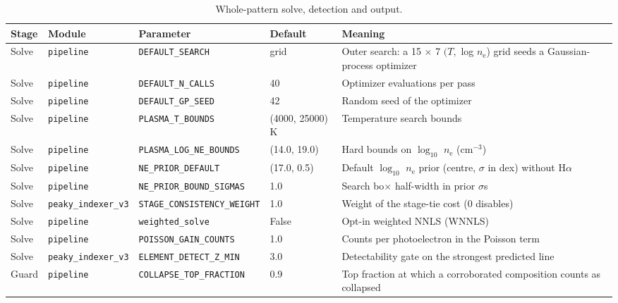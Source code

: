 \begin{table}[!htbp]
\centering
\caption{Whole-pattern solve, detection and output.}
\label{tab:params-solve}
\scriptsize
\setlength{\tabcolsep}{4pt}
\begin{tabular}{@{}p{}p{}p{}p{}p{}@{}}
\toprule
Stage & Module & Parameter & Default & Meaning \\
\midrule
Solve & \texttt{pipeline} & \texttt{DEFAULT\_\allowbreak{}SEARCH} & grid & Outer search: a 15 $\times$ 7 $(T,$ log $n_\mathrm{e}$) grid seeds a Gaussian-process optimizer \\
Solve & \texttt{pipeline} & \texttt{DEFAULT\_\allowbreak{}N\_\allowbreak{}CALLS} & 40 & Optimizer evaluations per pass \\
Solve & \texttt{pipeline} & \texttt{DEFAULT\_\allowbreak{}GP\_\allowbreak{}SEED} & 42 & Random seed of the optimizer \\
Solve & \texttt{pipeline} & \texttt{PLASMA\_\allowbreak{}T\_\allowbreak{}BOUNDS} & (4000, 25000) K & Temperature search bounds \\
Solve & \texttt{pipeline} & \texttt{PLASMA\_\allowbreak{}LOG\_\allowbreak{}NE\_\allowbreak{}BOUNDS} & (14.0, 19.0) & Hard bounds on $\log_{10}$ $n_\mathrm{e}$ (cm$^{-3}$) \\
Solve & \texttt{pipeline} & \texttt{NE\_\allowbreak{}PRIOR\_\allowbreak{}DEFAULT} & (17.0, 0.5) & Default $\log_{10}$ $n_\mathrm{e}$ prior (centre, $\sigma$ in dex) without H$\alpha$ \\
Solve & \texttt{pipeline} & \texttt{NE\_\allowbreak{}PRIOR\_\allowbreak{}BOUND\_\allowbreak{}SIGMAS} & 1.0 & Search bo$\times$ half-width in prior $\sigma$s \\
Solve & \texttt{peaky\_\allowbreak{}indexer\_\allowbreak{}v3} & \texttt{STAGE\_\allowbreak{}CONSISTENCY\_\allowbreak{}WEIGHT} & 1.0 & Weight of the stage-tie cost (0 disables) \\
Solve & \texttt{pipeline} & \texttt{weighted\_\allowbreak{}solve} & False & Opt-in weighted NNLS (WNNLS) \\
Solve & \texttt{pipeline} & \texttt{POISSON\_\allowbreak{}GAIN\_\allowbreak{}COUNTS} & 1.0 & Counts per photoelectron in the Poisson term \\
Solve & \texttt{peaky\_\allowbreak{}indexer\_\allowbreak{}v3} & \texttt{ELEMENT\_\allowbreak{}DETECT\_\allowbreak{}Z\_\allowbreak{}MIN} & 3.0 & Detectability gate on the strongest predicted line \\
Guard & \texttt{pipeline} & \texttt{COLLAPSE\_\allowbreak{}TOP\_\allowbreak{}FRACTION} & 0.9 & Top fraction at which a corroborated composition counts as collapsed \\

\end{tabular}
\end{table}

